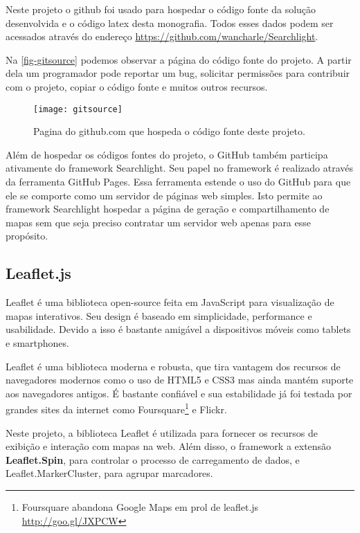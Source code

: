 Neste projeto o github foi usado para hospedar o código fonte da solução desenvolvida e o código latex desta monografia. Todos esses dados podem ser acessados através do endereço \url{https://github.com/wancharle/Searchlight}. 

Na \autoref{fig-gitsource} podemos observar a página do código fonte do projeto. A partir dela um programador pode reportar um bug, solicitar permissões para contribuir com o projeto, copiar o código fonte e muitos outros recursos. 

	\begin{figure}[htb]
	\caption{\label{fig-gitsource}Pagina do github.com que hospeda o código fonte deste projeto.}
	\begin{center}
	    \texttt{[image: gitsource]}
	\end{center}
\end{figure}

Além de hospedar os códigos fontes do projeto, o GitHub também participa ativamente do framework Searchlight. Seu papel no framework é realizado através da ferramenta GitHub Pages. Essa ferramenta estende o uso do GitHub para que ele se comporte como um servidor de páginas web simples. Isto permite ao framework Searchlight hospedar a página de geração e compartilhamento de mapas sem que seja preciso contratar um servidor web apenas para esse propósito.


\subsection{Leaflet.js}

Leaflet é uma biblioteca open-source feita em JavaScript para visualização de mapas interativos. Seu design é baseado em simplicidade, performance e usabilidade. Devido a isso é bastante amigável a dispositivos móveis como tablets e smartphones.

Leaflet é uma biblioteca moderna e robusta, que tira vantagem dos recursos de navegadores modernos como o uso de HTML5  e CSS3 mas ainda mantém suporte aos navegadores antigos.  É bastante confiável e sua estabilidade já foi testada por grandes sites da internet como Foursquare\footnote{Foursquare abandona Google Maps em prol de leaflet.js \url{http://goo.gl/JXPCW}} e Flickr.

Neste projeto, a biblioteca Leaflet é utilizada para fornecer os recursos de exibição e interação com mapas na web.  Além disso, o framework a extensão  \textbf{Leaflet.Spin}, para controlar o processo de carregamento de dados, e Leaflet.MarkerCluster, para agrupar marcadores.


